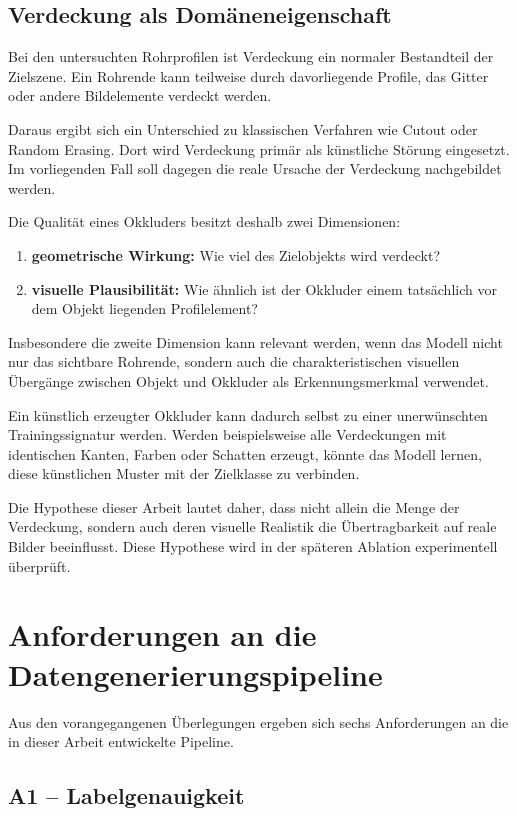 \subsection{Verdeckung als Domäneneigenschaft}

Bei den untersuchten Rohrprofilen ist Verdeckung ein normaler Bestandteil der Zielszene. Ein Rohrende kann teilweise durch davorliegende Profile, das Gitter oder andere Bildelemente verdeckt werden.

Daraus ergibt sich ein Unterschied zu klassischen Verfahren wie Cutout oder Random Erasing. Dort wird Verdeckung primär als künstliche Störung eingesetzt. Im vorliegenden Fall soll dagegen die reale Ursache der Verdeckung nachgebildet werden.

Die Qualität eines Okkluders besitzt deshalb zwei Dimensionen:
\begin{enumerate}
    \item \textbf{geometrische Wirkung:} Wie viel des Zielobjekts wird verdeckt?
    \item \textbf{visuelle Plausibilität:} Wie ähnlich ist der Okkluder einem tatsächlich vor dem Objekt liegenden Profilelement?
\end{enumerate}

Insbesondere die zweite Dimension kann relevant werden, wenn das Modell nicht nur das sichtbare Rohrende, sondern auch die charakteristischen visuellen Übergänge zwischen Objekt und Okkluder als Erkennungsmerkmal verwendet.

Ein künstlich erzeugter Okkluder kann dadurch selbst zu einer unerwünschten Trainingssignatur werden. Werden beispielsweise alle Verdeckungen mit identischen Kanten, Farben oder Schatten erzeugt, könnte das Modell lernen, diese künstlichen Muster mit der Zielklasse zu verbinden.

Die Hypothese dieser Arbeit lautet daher, dass nicht allein die Menge der Verdeckung, sondern auch deren visuelle Realistik die Übertragbarkeit auf reale Bilder beeinflusst. Diese Hypothese wird in der späteren Ablation experimentell überprüft.

\section{Anforderungen an die Datengenerierungspipeline}

Aus den vorangegangenen Überlegungen ergeben sich sechs Anforderungen an die in dieser Arbeit entwickelte Pipeline.

\subsection*{A1 -- Labelgenauigkeit}

